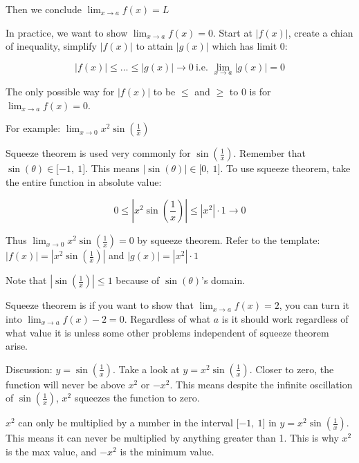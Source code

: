 \documentclass[
]{article}
\newcounter{example}
\begin{document}
Then we conclude $\lim_{x \rightarrow a}{f(x) = L}$

In practice, we want to show $\lim_{x \rightarrow a}{f(x) = 0}$. Start
at $|f(x)|$, create a chian of inequality, simplify $|f(x)|$ to
attain $|g(x)|$ which has limit 0:

$$\left| f(x) \right| \leq \ldots \leq \left| g(x) \right| \rightarrow 0\ \text{i.e.\ }\lim_{x \rightarrow a}{\left| g(x) \right| = 0}$$

The only possible way for $\left| f(x) \right|$ to be $\leq$ and
$\geq$ to 0 is for $\lim_{x \rightarrow a}{f(x) = 0}.$

For example:
$\lim_{x \rightarrow 0}{x^{2}\sin\left( \frac{1}{x} \right)}$

Squeeze theorem is used very commonly for
$\sin\left( \frac{1}{x} \right)$. Remember that
$\sin(\theta) \in \lbrack - 1,\ 1\rbrack$. This means
$\left| \sin(\theta) \right| \in \lbrack 0,\ 1\rbrack$. To use squeeze
theorem, take the entire function in absolute value:

$$0 \leq \left| x^{2}\sin\left( \frac{1}{x} \right) \right| \leq \left| x^{2} \right| \cdot 1 \rightarrow 0$$

Thus $\lim_{x \rightarrow 0}{x^{2}\sin\left( \frac{1}{x} \right)} = 0$
by squeeze theorem. Refer to the template:
$\left| f(x) \right| = \left| x^{2}\sin\left( \frac{1}{x} \right) \right|$
and $\left| g(x) \right| = \left| x^{2} \right| \cdot 1$

Note that $\left| \sin\left( \frac{1}{x} \right) \right| \leq 1$
because of $\sin(\theta)$'s domain.

Squeeze theorem is if you want to show that
$\lim_{x \rightarrow a}{f(x) = 2}$, you can turn it into
$\lim_{x \rightarrow a}{f(x) - 2 = 0}$. Regardless of what $a$ is it
should work regardless of what value it is unless some other problems
independent of squeeze theorem arise.

Discussion: $y = \sin\left( \frac{1}{x} \right)$. Take a look at
$y = x^{2}\sin\left( \frac{1}{x} \right)$. Closer to zero, the
function will never be above $x^{2}$ or $- x^{2}$. This means
despite the infinite oscillation of $\sin\left( \frac{1}{x} \right)$,
$x^{2}$ squeezes the function to zero.

$x^{2}$ can only be multiplied by a number in the interval
$\lbrack - 1,\ 1\rbrack$ in
$y = x^{2}\sin\left( \frac{1}{x} \right)$. This means it can never be
multiplied by anything greater than 1. This is why $x^{2}$ is the max
value, and $- x^{2}$ is the minimum value.
\end{document}
